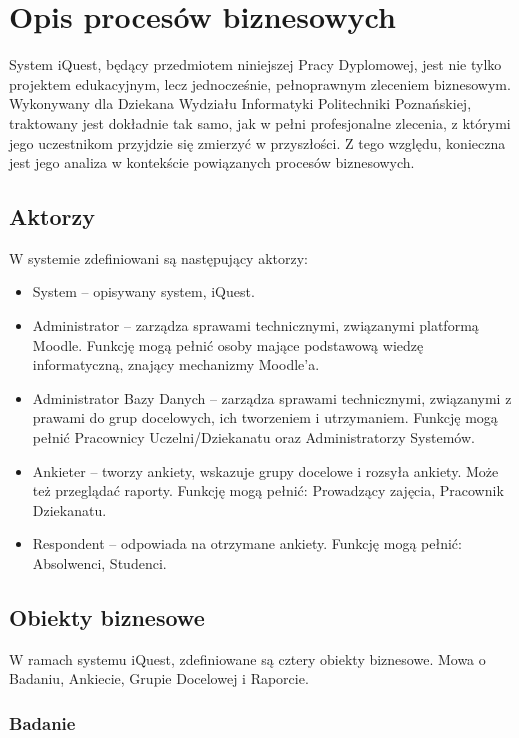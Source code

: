 \chapter{Opis procesów biznesowych}
\label{Chapter2}

System iQuest, będący przedmiotem niniejszej Pracy Dyplomowej, jest nie tylko projektem edukacyjnym, lecz jednocześnie, pełnoprawnym zleceniem biznesowym. Wykonywany dla Dziekana Wydziału Informatyki Politechniki Poznańskiej, traktowany jest dokładnie tak samo, jak w pełni profesjonalne zlecenia, z którymi jego uczestnikom przyjdzie się zmierzyć w przyszłości. Z tego względu, konieczna jest jego analiza w kontekście powiązanych procesów biznesowych.

\section{Aktorzy}
\label{Chapter21}

W systemie zdefiniowani są następujący aktorzy:
\begin{itemize}
\item System -- opisywany system, iQuest.
\item Administrator -- zarządza sprawami technicznymi, związanymi platformą Moodle. Funkcję mogą pełnić osoby mające podstawową wiedzę informatyczną, znający mechanizmy Moodle'a.
\item Administrator Bazy Danych -- zarządza sprawami technicznymi, związanymi z prawami do grup docelowych, ich tworzeniem i utrzymaniem. Funkcję mogą pełnić Pracownicy Uczelni\slash Dziekanatu oraz Administratorzy Systemów.
\item Ankieter -- tworzy ankiety, wskazuje grupy docelowe i rozsyła ankiety. Może też przeglądać raporty. Funkcję mogą pełnić: Prowadzący zajęcia, Pracownik Dziekanatu.
\item Respondent -- odpowiada na otrzymane ankiety. Funkcję mogą pełnić: Absolwenci, Studenci.
\end{itemize}

\section{Obiekty biznesowe}
\label{Chapter22}

W ramach systemu iQuest, zdefiniowane są cztery obiekty biznesowe. Mowa o Badaniu, Ankiecie, Grupie Docelowej i Raporcie.

\subsection{Badanie}

